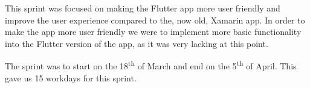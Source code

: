 This sprint was focused on making the Flutter app more user friendly and improve the user experience compared to the, now old, Xamarin app.
In order to make the app more user friendly we were to implement more basic functionality into the Flutter version of the app, as it was very lacking at this point.

The sprint was to start on the 18\textsuperscript{th} of March and end on the 5\textsuperscript{th} of April. 
This gave us 15 workdays for this sprint.
